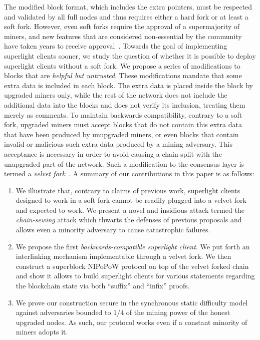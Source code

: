 The modified block format, which includes the extra pointers, must be respected
and validated by all full nodes and thus requires either a hard fork or at least
a soft fork. However, even soft forks require the approval of a supermajority of
miners, and new features that are considered non-essential by the community have
taken years to receive approval~\cite{segwit}. Towards the goal of implementing
superlight clients sooner, we study the question of whether it is possible to
deploy superlight clients without a soft fork. We propose a series of
modifications to blocks that are \emph{helpful but untrusted}. These
modifications mandate that some extra data is included in each block. The extra
data is placed inside the block by upgraded miners only, while the rest of the
network does not include the additional data into the blocks and does not verify
its inclusion, treating them merely as comments. To maintain backwards
compatibility, contrary to a soft fork, upgraded miners must accept blocks that
do not contain this extra data that have been produced by unupgraded miners, or
even blocks that contain invalid or malicious such extra data produced by a
mining adversary. This acceptance is necessary in order to avoid causing a chain
split with the unupgraded part of the network. Such a modification to the
consensus layer is termed a \emph{velvet fork}~\cite{velvet}.
A summary of our contributions in this paper is as follows:
\begin{enumerate}
  \item We illustrate that, contrary to claims of previous work, superlight
        clients designed to work in a soft fork cannot be readily plugged into a velvet fork and expected to work. We present a novel and insidious
        attack termed the \emph{chain-sewing} attack which thwarts the defenses of previous proposals and allows even a minority adversary to cause
        catastrophic failures.
  \item We propose the first \emph{backwards-compatible superlight client}. We put forth an interlinking mechanism implementable through a velvet fork. We then construct a superblock NIPoPoW protocol on top of the velvet forked chain and show it allows to build superlight clients for various statements regarding the blockchain state via both ``suffix'' and ``infix'' proofs. 
  \item We prove our construction secure in the synchronous static difficulty model against adversaries bounded to $1/4$ of the mining power of the honest upgraded nodes. As such, our protocol works even if a constant minority of miners adopts it.
\end{enumerate}

